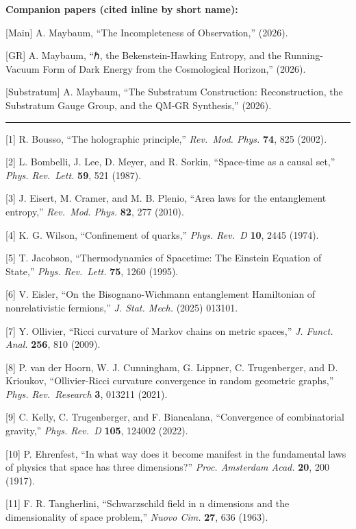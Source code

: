 \documentclass[
]{article}
\begin{document}
\textbf{Companion papers (cited inline by short name):}

{[}Main{]} A. Maybaum, ``The Incompleteness of Observation,'' (2026).

{[}GR{]} A. Maybaum, ``ℏ, the Bekenstein-Hawking Entropy, and the
Running-Vacuum Form of Dark Energy from the Cosmological Horizon,''
(2026).

{[}Substratum{]} A. Maybaum, ``The Substratum Construction:
Reconstruction, the Substratum Gauge Group, and the QM-GR Synthesis,''
(2026).

\begin{center}\rule{0.5\linewidth}{0.5pt}\end{center}

{[}1{]} R. Bousso, ``The holographic principle,'' \emph{Rev.~Mod. Phys.}
\textbf{74}, 825 (2002).

{[}2{]} L. Bombelli, J. Lee, D. Meyer, and R. Sorkin, ``Space-time as a
causal set,'' \emph{Phys. Rev.~Lett.} \textbf{59}, 521 (1987).

{[}3{]} J. Eisert, M. Cramer, and M. B. Plenio, ``Area laws for the
entanglement entropy,'' \emph{Rev.~Mod. Phys.} \textbf{82}, 277 (2010).

{[}4{]} K. G. Wilson, ``Confinement of quarks,'' \emph{Phys. Rev.~D}
\textbf{10}, 2445 (1974).

{[}5{]} T. Jacobson, ``Thermodynamics of Spacetime: The Einstein
Equation of State,'' \emph{Phys. Rev.~Lett.} \textbf{75}, 1260 (1995).

{[}6{]} V. Eisler, ``On the Bisognano-Wichmann entanglement Hamiltonian
of nonrelativistic fermions,'' \emph{J. Stat. Mech.} (2025) 013101.

{[}7{]} Y. Ollivier, ``Ricci curvature of Markov chains on metric
spaces,'' \emph{J. Funct. Anal.} \textbf{256}, 810 (2009).

{[}8{]} P. van der Hoorn, W. J. Cunningham, G. Lippner, C. Trugenberger,
and D. Krioukov, ``Ollivier-Ricci curvature convergence in random
geometric graphs,'' \emph{Phys. Rev.~Research} \textbf{3}, 013211
(2021).

{[}9{]} C. Kelly, C. Trugenberger, and F. Biancalana, ``Convergence of
combinatorial gravity,'' \emph{Phys. Rev.~D} \textbf{105}, 124002
(2022).

{[}10{]} P. Ehrenfest, ``In what way does it become manifest in the
fundamental laws of physics that space has three dimensions?''
\emph{Proc. Amsterdam Acad.} \textbf{20}, 200 (1917).

{[}11{]} F. R. Tangherlini, ``Schwarzschild field in n dimensions and
the dimensionality of space problem,'' \emph{Nuovo Cim.} \textbf{27},
636 (1963).
\end{document}
